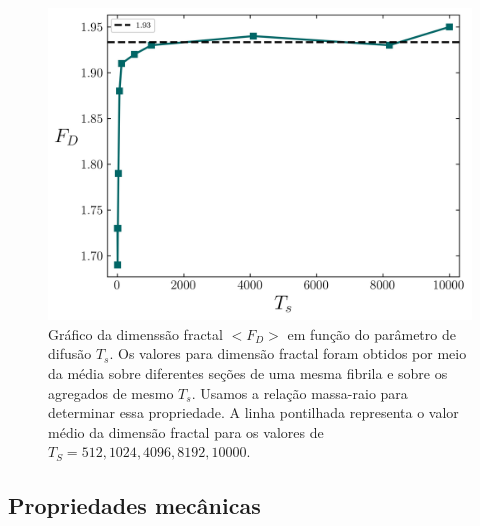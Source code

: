\documentclass{article}
\begin{document}
    \begin{figure}[H]
        \centering
        \includegraphics[width=\textwidth]{figures/dim_frac.png}

        \caption{ Gráfico da dimenssão fractal $<F_{D}>$ em função do parâmetro de difusão \(T_{s}\). Os valores para 
        dimensão fractal foram obtidos por meio da média sobre diferentes seções de uma mesma fibrila e sobre os agregados
        de mesmo  \(T_{s}\). Usamos a relação massa-raio para determinar essa propriedade. A linha pontilhada representa 
        o valor médio da dimensão fractal para os valores de \(T_{S}=512,1024,4096,8192,10000\).} 

        \label{R4}
    \end{figure}


    \subsection{Propriedades mecânicas}
\end{document}
